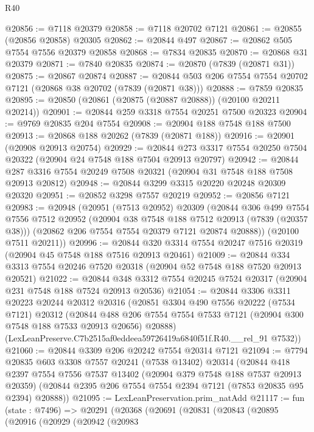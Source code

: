 \begin{lexlean}{R40}
\begin{coremodule}
@20856 := @7118 @20379
@20858 := @7118 @20702 @7121
@20861 := @20855 (@20856 @20858) @20305
@20862 := @20844 @497
@20867 := @20862 @505 @7554 @7556 @20379 @20858
@20868 := @7834 @20835
@20870 := @20868 @31 @20379
@20871 := @7840 @20835
@20874 := @20870 (@7839 (@20871 @31))
@20875 := @20867 @20874
@20887 := @20844 @503 @206 @7554 @7554 @20702 @7121 (@20868 @38 @20702 (@7839 (@20871 @38)))
@20888 := @7859 @20835
@20895 := @20850 (@20861 (@20875 (@20887 @20888)) (@20100 @20211 @20214))
@20901 := @20844 @259 @3318 @7554 @20251 @7500 @20323
@20904 := @9769 @20835 @204 @7554
@20908 := @20904 @188 @7548 @188 @7500
@20913 := @20868 @188 @20262 (@7839 (@20871 @188))
@20916 := @20901 (@20908 @20913 @20754)
@20929 := @20844 @273 @3317 @7554 @20250 @7504 @20322 (@20904 @24 @7548 @188 @7504 @20913 @20797)
@20942 := @20844 @287 @3316 @7554 @20249 @7508 @20321 (@20904 @31 @7548 @188 @7508 @20913 @20812)
@20948 := @20844 @3299 @3315 @20220 @20248 @20309 @20320
@20951 := @20852 @3298 @7557 @20219
@20952 := @20856 @7121
@20983 := @20948
    (@20951
      (@7513 @20952)
      @20309
      (@20844
        @306
        @499
        @7554
        @7556
        @7512
        @20952
        (@20904 @38 @7548 @188 @7512 @20913 (@7839 (@20357 @38)))
        (@20862 @206 @7554 @7554 @20379 @7121 @20874 @20888))
      (@20100 @7511 @20211))
@20996 := @20844 @320 @3314 @7554 @20247 @7516 @20319 (@20904 @45 @7548 @188 @7516 @20913 @20461)
@21009 := @20844 @334 @3313 @7554 @20246 @7520 @20318 (@20904 @52 @7548 @188 @7520 @20913 @20521)
@21022 := @20844 @348 @3312 @7554 @20245 @7524 @20317 (@20904 @231 @7548 @188 @7524 @20913 @20536)
@21054 := @20844
    @3306
    @3311
    @20223
    @20244
    @20312
    @20316
    (@20851
      @3304
      @490
      @7556
      @20222
      (@7534 @7121)
      @20312
      (@20844 @488 @206 @7554 @7554 @7533 @7121 (@20904 @300 @7548 @188 @7533 @20913 @20656) @20888)
      (LexLeanPreserve.C7b2515af0eddeea59726419a6840f51f.R40.__rel_91 @7532))
@21060 := @20844 @3309 @206 @20242 @7554 @20314 @7121
@21094 := @7794
    @20835
    @603
    @3308
    @7557
    @20241
    (@7538 @13402)
    @20314
    (@20844
      @418
      @2397
      @7554
      @7556
      @7537
      @13402
      (@20904 @379 @7548 @188 @7537 @20913 @20359)
      (@20844 @2395 @206 @7554 @7554 @2394 @7121 (@7853 @20835 @95 @2394) @20888))
@21095 := LexLeanPreservation.prim_natAdd
@21117 := fun (state : @7496) =>
  @20291
    (@20368
      (@20691
        (@20831
          (@20843
            (@20895
              (@20916
                (@20929
                  (@20942
                    (@20983

\end{coremodule}
\end{lexlean}
